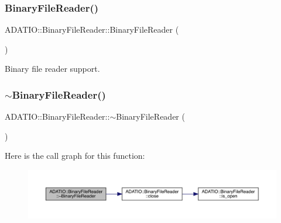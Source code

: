 \subsubsection{\texorpdfstring{BinaryFileReader()}{BinaryFileReader()}\hspace{0.1cm}{\footnotesize\ttfamily [1/4]}}
{\footnotesize\ttfamily A\+D\+A\+T\+I\+O\+::\+Binary\+File\+Reader\+::\+Binary\+File\+Reader (\begin{DoxyParamCaption}{ }\end{DoxyParamCaption})}



Binary file reader support. 

\mbox{\label{classADATIO_1_1BinaryFileReader_aa0905fcdd1723ce850a89baf9a111345}} 
\subsubsection{\texorpdfstring{$\sim$BinaryFileReader()}{~BinaryFileReader()}\hspace{0.1cm}{\footnotesize\ttfamily [1/2]}}
{\footnotesize\ttfamily A\+D\+A\+T\+I\+O\+::\+Binary\+File\+Reader\+::$\sim$\+Binary\+File\+Reader (\begin{DoxyParamCaption}{ }\end{DoxyParamCaption})}

Here is the call graph for this function\+:\nopagebreak
\begin{figure}[H]
\begin{center}
\leavevmode
\includegraphics[width=350pt]{df/d41/classADATIO_1_1BinaryFileReader_aa0905fcdd1723ce850a89baf9a111345_cgraph}
\end{center}
\end{figure}
\mbox{\label{classADATIO_1_1BinaryFileReader_a987273f138d0fcc4a1e9a95c51b093ef}} 
